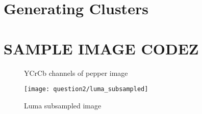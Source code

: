 \section{Generating Clusters}


\section{SAMPLE IMAGE CODEZ}
\begin{figure}[ht]
\centering
	\caption{YCrCb channels of pepper image}
	\label{fig:noiseGeneration.toy}
\end{figure}
 	
\clearpage

\begin{figure}[ht]
\centering	
	\texttt{[image: question2/luma\_subsampled]}
	\caption{Luma subsampled image}
\end{figure}
